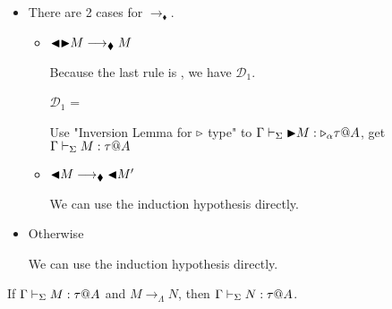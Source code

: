 \begin{itemize}
	\newcommand{\R}{\longrightarrow_{\blacklozenge}}
											
	\item \TTBL
	      	      	      	      	      	      		      	      	      	      
	      There are 2 cases for $\R$.
	      	      	      	      	      	      		      	      	      	      
	      \begin{itemize}
	      	\item $\TBL\TB M \R M$
	      	      	      	      	      	      	      	      	      	      	      	      		      	      	      	      	      	      	      	      
	      	      Because the last rule is \TTBL, we have $\mathcal{D}_1$.
	      	      	      	      	      	      	      	      	      	      	      	      		      	      	      	      	      	      	      	      
	      	      $\mathcal{D}_1$ = 
	      	      {}
	      	      	      	      	      	      	      	      	      	      	      	      		      	      	      	      	      	      	      	      
	      	      Use "Inversion Lemma for ${\mathop{\triangleright}}$ type" to $\Gamma \vdash_\Sigma {\mathop{\blacktriangleright}} M : {\mathop{\triangleright}}_\alpha \tau @A$,  get $\Gamma \vdash_\Sigma M : \tau @A$
	      	      	      	      	      	      	      	      	      	      	      	      		      	      	      	      	      	      	      	      
	      	\item $\TBL M \R \TBL M'$
	      	      	      	      	      	      	      	      	      	      	      	      		      	      	      	      	      	      	      	      
	      	      We can use the induction hypothesis directly.
	      \end{itemize}
	      	      	      	      	      	      		      	      	      	      
	\item Otherwise
	      	      	      	      	      	      		      	      	      	      
	      We can use the induction hypothesis directly.
\end{itemize}
	

\begin{theorem}
	If $\G\V M:\tau@A$ and $M \longrightarrow_{\Lambda} N$, then $\G\V N:\tau@A$.
\end{theorem}
	
